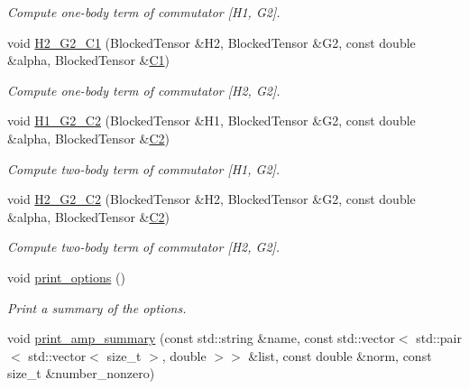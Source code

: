 \begin{DoxyCompactItemize}
\begin{DoxyCompactList}\small\item\em Compute one-\/body term of commutator \mbox{[}H1, G2\mbox{]}. \end{DoxyCompactList}\item 
void \mbox{\hyperlink{classforte_1_1_m_r_d_s_r_g_a92cceb7d9036f37b7013cafce0b27179}{H2\+\_\+\+G2\+\_\+\+C1}} (Blocked\+Tensor \&H2, Blocked\+Tensor \&G2, const double \&alpha, Blocked\+Tensor \&\mbox{\hyperlink{namespaceforte_abe00ec86d0015c0f2b6ac298c6e428e4a1a2ddc2db4693cfd16d534cde5572cc1}{C1}})
\begin{DoxyCompactList}\small\item\em Compute one-\/body term of commutator \mbox{[}H2, G2\mbox{]}. \end{DoxyCompactList}\item 
void \mbox{\hyperlink{classforte_1_1_m_r_d_s_r_g_a5d2d27cb45e6395e638864835e30667f}{H1\+\_\+\+G2\+\_\+\+C2}} (Blocked\+Tensor \&H1, Blocked\+Tensor \&G2, const double \&alpha, Blocked\+Tensor \&\mbox{\hyperlink{namespaceforte_abe00ec86d0015c0f2b6ac298c6e428e4af1a543f5a2c5d49bc5dde298fcf716e4}{C2}})
\begin{DoxyCompactList}\small\item\em Compute two-\/body term of commutator \mbox{[}H1, G2\mbox{]}. \end{DoxyCompactList}\item 
void \mbox{\hyperlink{classforte_1_1_m_r_d_s_r_g_ae64c5b40a006c4faf9a11010d0b1c6c0}{H2\+\_\+\+G2\+\_\+\+C2}} (Blocked\+Tensor \&H2, Blocked\+Tensor \&G2, const double \&alpha, Blocked\+Tensor \&\mbox{\hyperlink{namespaceforte_abe00ec86d0015c0f2b6ac298c6e428e4af1a543f5a2c5d49bc5dde298fcf716e4}{C2}})
\begin{DoxyCompactList}\small\item\em Compute two-\/body term of commutator \mbox{[}H2, G2\mbox{]}. \end{DoxyCompactList}\item 
void \mbox{\hyperlink{classforte_1_1_m_r_d_s_r_g_a351fb133a78a9a92103f252147ef88cd}{print\+\_\+options}} ()
\begin{DoxyCompactList}\small\item\em Print a summary of the options. \end{DoxyCompactList}\item 
void \mbox{\hyperlink{classforte_1_1_m_r_d_s_r_g_ab1952878ad3432d39755b2d02dfd6a78}{print\+\_\+amp\+\_\+summary}} (const std\+::string \&name, const std\+::vector$<$ std\+::pair$<$ std\+::vector$<$ size\+\_\+t $>$, double $>$$>$ \&list, const double \&norm, const size\+\_\+t \&number\+\_\+nonzero)
$$
\end{DoxyCompactItemize}
